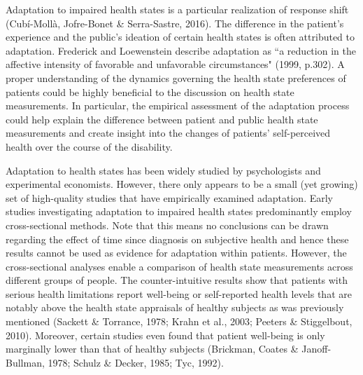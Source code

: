 \documentclass[12pt]{article}
\begin{document}
Adaptation to impaired health states is a particular realization of response shift (Cub\'i-Moll\`a, Jofre-Bonet \& Serra-Sastre, 2016). The difference in the patient's experience and the public's ideation of certain health states is often attributed to adaptation. Frederick and Loewenstein describe adaptation as ``a reduction in the affective intensity of favorable and unfavorable circumstances" (1999, p.302). A proper understanding of the dynamics governing the health state preferences of patients could be highly beneficial to the discussion on health state measurements. In particular, the empirical assessment of the adaptation process could help explain the difference between patient and public health state measurements and create insight into the changes of patients' self-perceived health over the course of the disability. 

Adaptation to health states has been widely studied by psychologists and experimental economists. However, there only appears to be a small (yet growing) set of high-quality studies that have empirically examined adaptation. Early studies investigating adaptation to impaired health states predominantly employ cross-sectional methods. Note that this means no conclusions can be drawn regarding the effect of time since diagnosis on subjective health and hence these results cannot be used as evidence for adaptation within patients. However, the cross-sectional analyses enable a comparison of health state measurements across different groups of people. The counter-intuitive results show that patients with serious health limitations report well-being or self-reported health levels that are notably above the health state appraisals of healthy subjects as was previously mentioned (Sackett \& Torrance, 1978; Krahn et al., 2003; Peeters \& Stiggelbout, 2010). Moreover, certain studies even found that patient well-being is only marginally lower than that of healthy subjects (Brickman, Coates \& Janoff-Bullman, 1978; Schulz \& Decker, 1985; Tyc, 1992).
\end{document}
